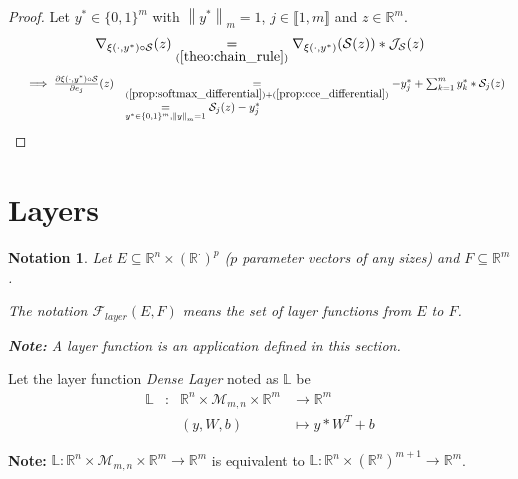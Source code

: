 \documentclass[11pt,en]{elegantpaper}
\newtheorem{notation}{Notation}
\newcommand{\norm}[1]{\left\lVert#1\right\rVert}
\newcommand{\Real}{\mathbb{R}}
\begin{document}
\begin{proof}
  Let $y^* \in \{0,1\}^m$ with $\norm{y^*}_m = 1$, $j \in \llbracket 1,m \rrbracket$ and $z \in \Real^m$. \begin{equation*}
    \begin{gathered}
      \nabla_{\xi(\cdot,y^*) \circ \mathcal{S}}(z) \underset{(\ref{theo:chain_rule})}{=} \nabla_{\xi(\cdot,y^*)}(\mathcal{S}(z)) * \mathcal{J}_{\mathcal{S}}(z)
    \end{gathered}
  \end{equation*}
  \begin{equation*}
    \begin{array}{lll}
      & \implies \frac{\partial \xi(\cdot,y^*) \circ \mathcal{S}}{\partial e_j} (z)
        & \underset{(\ref{prop:softmax_differential}) + (\ref{prop:cce_differential})}= - y_j^* + \sum_{k=1}^m {y_k^* * \mathcal{S}_j(z)} \\
      & & \underset{y^* \in \{0,1\}^m, \norm{y}_m = 1}{=} \mathcal{S}_j(z) - y_j^*
    \end{array}
  \end{equation*}
\end{proof}

\section{Layers}

\begin{notation}
  Let $E \subseteq \Real^n \times (\Real^{\cdot})^p$ ($p$ parameter vectors of any sizes) and $F \subseteq \Real^m$. \par
  The notation $\mathcal{F}_{layer}(E,F)$ means the set of layer functions from $E$ to $F$. \par
  \textbf{Note:} A layer function is an application defined in this section. \par
\end{notation}

\begin{definition}
  Let the layer function \textit{Dense Layer} noted as $\mathbb{L}$ be
  \begin{equation*}
    \begin{array}{llll}
      \mathbb{L} & : & \Real^n \times \mathcal{M}_{m,n} \times \Real^m & \longrightarrow \Real^m \\
      &   & (y,W,b) & \longmapsto y * W^T + b
    \end{array}
  \end{equation*} \par
  \textbf{Note:} $\mathbb{L} : \Real^n \times \mathcal{M}_{m,n} \times \Real^m \longrightarrow \Real^m$
  is equivalent to $\mathbb{L} : \Real^n \times (\Real^n)^{m+1} \longrightarrow \Real^m$.
\end{definition}
\end{document}
